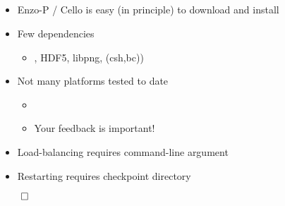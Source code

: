 \NEWSEC

\subsection{\ssStartingSummary}


\begin{frame}[fragile,label=ss-starting-summary] 
\secframetitle{\ssStartingSummary}
\begin{itemize}
\item Enzo-P / Cello is easy (in principle) to download and install
\item Few dependencies
\begin{itemize}
\item \charm, HDF5, libpng, (csh,bc))
\end{itemize}
\item Not many platforms tested to date
\begin{itemize}
\item {}
\item Your feedback is important!
\end{itemize}
\item Load-balancing requires command-line argument
\item Restarting requires checkpoint directory
\end{itemize}
\vfill
\centerline{$\qed$}
\end{frame}

